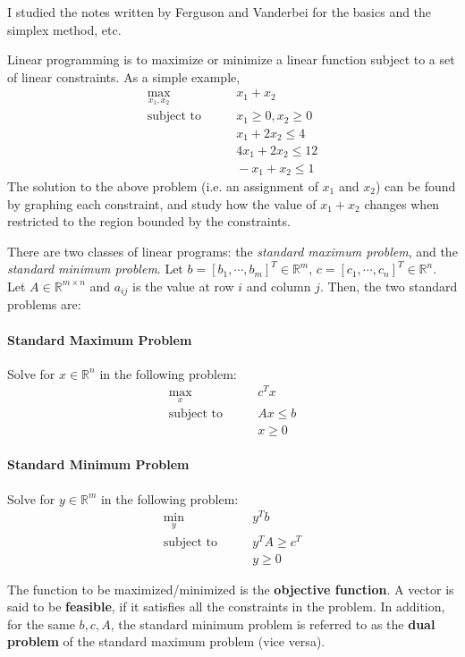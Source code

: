 \documentclass[12pt]{article}
\begin{document}
I studied the notes written by Ferguson \cite{ferguson1958linear} and Vanderbei \cite{vanderbei2015linear} for the basics and the simplex method, etc.

Linear programming is to maximize or minimize a linear function subject to a set of linear constraints. As a simple example,
\begin{align}
  \max_{x_1, x_2}&\qquad x_1 + x_2\\
  \text{subject to}&\qquad x_1\geq 0, x_2\geq 0\\
  &\qquad x_1 + 2x_2\leq 4\\
  &\qquad 4x_1 + 2x_2\leq 12\\
  &\qquad -x_1 + x_2 \leq 1
\end{align}
The solution to the above problem (i.e. an assignment of $x_1$ and $x_2$) can be found by graphing each constraint, and study how the value of $x_1+x_2$ changes when restricted to the region bounded by the constraints.

There are two classes of linear programs: the \emph{standard maximum problem}, and the \emph{standard minimum problem}. Let $b=[b_1, \cdots, b_m]^T\in\mathbb{R}^{m}$, $c=[c_1,\cdots,c_n]^T\in\mathbb{R}^n$. Let $A\in\mathbb{R}^{m\times n}$ and $a_{ij}$ is the value at row $i$ and column $j$. Then, the two standard problems are:
\paragraph{Standard Maximum Problem} Solve for $x\in\mathbb{R}^n$ in the following problem:
\begin{align}
  \max_{x}&\qquad c^Tx\\
  \text{subject to}&\qquad Ax\leq b\\
  &\qquad x\geq 0
\end{align}

\paragraph{Standard Minimum Problem} Solve for $y\in\mathbb{R}^m$ in the following problem:
\begin{align}
  \min_{y}&\qquad y^Tb\\
  \text{subject to}&\qquad y^TA\geq c^T\\
  &\qquad y\geq 0
\end{align}

The function to be maximized/minimized is the \textbf{objective function}. A vector is said to be \textbf{feasible}, if it satisfies all the constraints in the problem. In addition, for the same $b, c, A$, the standard minimum problem is referred to as the \textbf{dual problem} of the standard maximum problem (vice versa).
\end{document}
